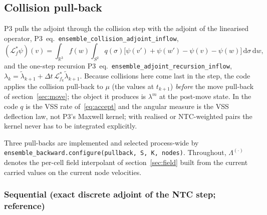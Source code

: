 \documentclass[11pt,a4paper]{article}
\numberwithin{equation}{section}
\newcommand{\R}{\mathbb{R}}
\newcommand{\code}[1]{\texttt{#1}}
\newcommand{\Lam}{\Lambda}
\newcommand{\dd}{\mathrm{d}}
\newcommand{\pref}[1]{P3~eq.~\code{#1}}
\begin{document}
\subsection{Collision pull-back}
\label{sec:collision}

P3 pulls the adjoint through the collision step with the adjoint of the linearised
operator, \pref{ensemble\_collision\_adjoint\_inflow},
\begin{equation}
\label{eq:Lstar}
(\mathcal L^*_{f} \psi)(v) = \int_{\R^3} f(w) \int_{S^2} q(\sigma)
\big[\psi(v') + \psi(w') - \psi(v) - \psi(w)\big]\, \dd\sigma\, \dd w,
\end{equation}
and the one-step recursion \pref{ensemble\_adjoint\_recursion\_inflow},
$\lambda_k = \tilde\lambda_{k+1} + \Delta t\, \mathcal L^*_{f_k}\tilde\lambda_{k+1}$.
Because collisions here come last in the step, the code applies the collision
pull-back to $\mu$ (the values at $t_{k+1}$) \emph{before} the move pull-back of
section~\ref{sec:move}; the object it produces is $\lambda^m$ at the post-move state.
In the code $q$ is the VSS rate of~\eqref{eq:accept} and the angular measure is the
VSS deflection law, not P3's Maxwell kernel; with realised or NTC-weighted pairs the
kernel never has to be integrated explicitly.

Three pull-backs are implemented and selected process-wide by
\code{ensemble\_backward.configure(pullback, S, K, nodes)}.  Throughout,
$\Lam^{(\cdot)}$ denotes the per-cell field interpolant of section~\ref{sec:field}
built from the current carried values on the current node velocities.

\subsubsection{Sequential (exact discrete adjoint of the NTC step; reference)}
\label{sec:sequential}
\end{document}
